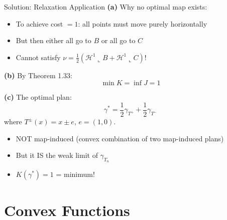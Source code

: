 \documentclass[aspectratio=169]{beamer}
\newcommand{\Hone}{\mathcal{H}^1}
\begin{document}
\begin{frame}{Solution: Relaxation Application}
\textbf{(a)} Why no optimal map exists:
\begin{itemize}
    \item To achieve cost $= 1$: all points must move purely horizontally
    \item But then either all go to $B$ or all go to $C$
    \item Cannot satisfy $\nu = \frac{1}{2}(\Hone \llcorner B + \Hone \llcorner C)$!
\end{itemize}

\vspace{0.3cm}
\textbf{(b)} By Theorem 1.33:
\[
\min K = \inf J = 1
\]

\vspace{0.3cm}
\textbf{(c)} The optimal plan:
\[
\boxed{\gamma^* = \frac{1}{2}\gamma_{T^+} + \frac{1}{2}\gamma_{T^-}}
\]
where $T^\pm(x) = x \pm e$, $e = (1, 0)$.
\begin{itemize}
    \item NOT map-induced (convex combination of two map-induced plans)
    \item But it IS the weak limit of $\gamma_{T_n}$
    \item $K(\gamma^*) = 1$ = minimum!
\end{itemize}
\end{frame}

\section{Convex Functions}
\end{document}

